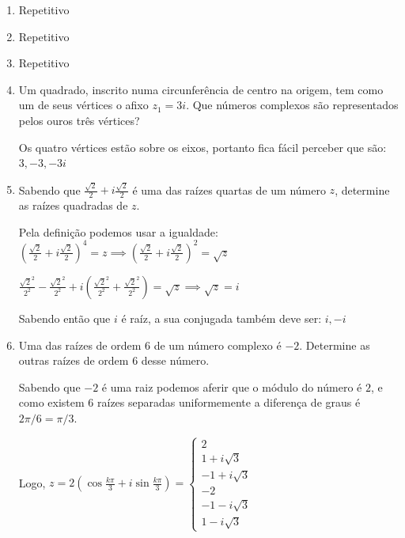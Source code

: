 \documentclass[12pt, openright, a4paper, twoside, english, brazil]{article}
\newenvironment{qitem}{
  \color{black}
\item}{\vspace{10pt}}
\newcommand{\cis}[1]{\displaystyle(\cos#1+i\sin#1)}
\begin{document}
\begin{enumerate}[\bfseries 1.]
\begin{qitem} %
  \color{red}Repetitivo
\end{qitem}

\begin{qitem} %
  \color{red}Repetitivo
\end{qitem}

\begin{qitem} %
  \color{red}Repetitivo
\end{qitem}

\begin{qitem} %
  Um quadrado, inscrito numa circunferência de centro na origem, tem
  como um de seus vértices o afixo $z_1=3i$. Que números complexos
  são representados pelos ouros três vértices?

  \color{red}
  Os quatro vértices estão sobre os eixos, portanto fica fácil
  perceber que são: $3,-3,-3i$
\end{qitem}

\begin{qitem} %
  Sabendo que $\frac{\sqrt2}{2}+i\frac{\sqrt2}{2}$ é uma das raízes
  quartas de um número $z$, determine as raízes quadradas de $z$.

  \color{red}
  Pela definição podemos usar a igualdade:
  $\left(\frac{\sqrt2}{2}+i\frac{\sqrt2}{2}\right)^4=z\implies
  \left(\frac{\sqrt2}{2}+i\frac{\sqrt2}{2}\right)^2=\sqrt z$

  $\frac{\sqrt2^2}{2^2}-\frac{\sqrt2^2}{2^2}+i\left(\frac{\sqrt2^2}{2^2}+\frac{\sqrt2^2}{2^2}\right)=\sqrt
  z\implies \sqrt{z}=i$

  Sabendo então que $i$ é raíz, a sua conjugada também deve ser: $i, -i$
\end{qitem}

\begin{qitem} %
  Uma das raízes de ordem $6$ de um número complexo é $-2$. Determine
  as outras raízes de ordem $6$ desse número.

  \color{red}
  Sabendo que $-2$ é uma raiz podemos aferir que o módulo do número é
  $2$, e como existem 6 raízes separadas uniformemente a diferença de
  graus é $2\pi/6=\pi/3$.

  Logo, $z=2\cis{\frac{k\pi}{3}}=
  \begin{cases}2\\1+i\sqrt3\\-1+i\sqrt3\\-2\\-1-i\sqrt3\\1-i\sqrt3
  \end{cases}$
\end{qitem}


\end{enumerate}
\end{document}

